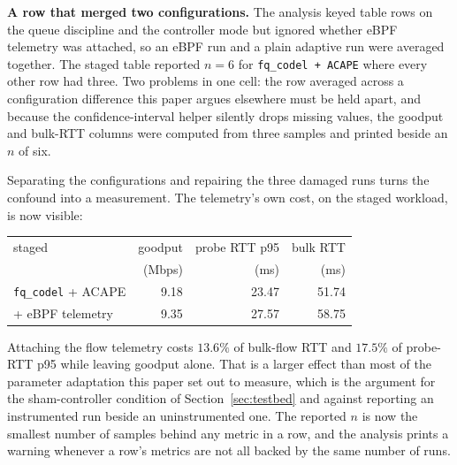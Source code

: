 \textbf{A row that merged two configurations.} The analysis keyed table rows
on the queue discipline and the controller mode but ignored whether eBPF
telemetry was attached, so an eBPF run and a plain adaptive run were averaged
together. The staged table reported $n=6$ for \texttt{fq\_codel + ACAPE} where
every other row had three. Two problems in one cell: the row averaged across
a configuration difference this paper argues elsewhere must be held apart, and
because the confidence-interval helper silently drops missing values, the
goodput and bulk-RTT columns were computed from three samples and printed
beside an $n$ of six.

Separating the configurations and repairing the three damaged runs turns the
confound into a measurement. The telemetry's own cost, on the staged workload,
is now visible:

\begin{center}
\small
\begin{tabular}{lrrr}
\hline
staged & goodput & probe RTT p95 & bulk RTT \\
 & (Mbps) & (ms) & (ms) \\
\hline
\texttt{fq\_codel} + ACAPE & 9.18 & 23.47 & 51.74 \\
\quad + eBPF telemetry & 9.35 & 27.57 & 58.75 \\
\hline
\end{tabular}
\end{center}

Attaching the flow telemetry costs $13.6\%$ of bulk-flow RTT and $17.5\%$ of
probe-RTT p95 while leaving goodput alone. That is a larger effect than most
of the parameter adaptation this paper set out to measure, which is the
argument for the sham-controller condition of
Section~\ref{sec:testbed} and against reporting an instrumented run beside an
uninstrumented one. The reported $n$ is now the smallest number of samples
behind any metric in a row, and the analysis prints a warning whenever a
row's metrics are not all backed by the same number of runs.
